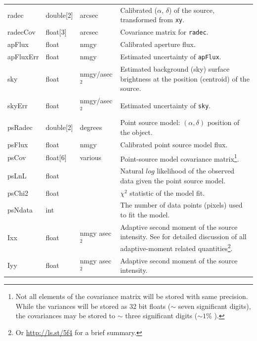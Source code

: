 \documentclass[12pt]{article}
\begin{document}
\begin{center}
\begin{longtable}{p{3cm}p{2cm}p{2cm}p{5cm}}
radec & double[2] & arcsec & Calibrated ($\alpha$, $\delta$) of the source, transformed from {\tt xy}.\\

radecCov & float[3] & arcsec & Covariance matrix for {\tt radec}. \\

apFlux & float & nmgy & Calibrated aperture flux. \\

apFluxErr & float & nmgy &  Estimated uncertainty of \texttt{apFlux}. \\

sky & float & nmgy/asec$^{2}$ & Estimated background (sky) surface brightness at the position (centroid) of the source. \\

skyErr & float & nmgy/asec$^{2}$ & Estimated uncertainty of \texttt{sky}. \\

psRadec & double[2] & degrees & Point source model: $(\alpha, \delta)$ position of the object. \\

psFlux & float & nmgy & Calibrated point source model flux.\\

psCov & float[6] & various & Point-source model covariance matrix\footnote{Not all elements of the covariance matrix will be stored with same precision. While the variances will be stored as 32 bit floats ($\sim$ seven significant digits), the covariances may be stored to $\sim$ three significant digits ($\sim 1$\% ).}. \\

psLnL & float & ~ & Natural $log$ likelihood of the observed data given the point source model. \\

psChi2 & float & ~ & $\chi^2$ statistic of the model fit. \\

psNdata & int & ~ & The number of data points (pixels) used to fit the model. \\

Ixx & float & nmgy asec$^{2}$ & Adaptive second moment of the source intensity. See \citet{2002AJ....123..583B} for detailed discussion of all adaptive-moment related quantities\footnote{Or \url{http://ls.st/5f4} for a brief summary.}. \\

Iyy & float & nmgy asec$^{2}$ & Adaptive second moment of the source intensity. \\


\end{longtable}
\end{center}
\end{document}
